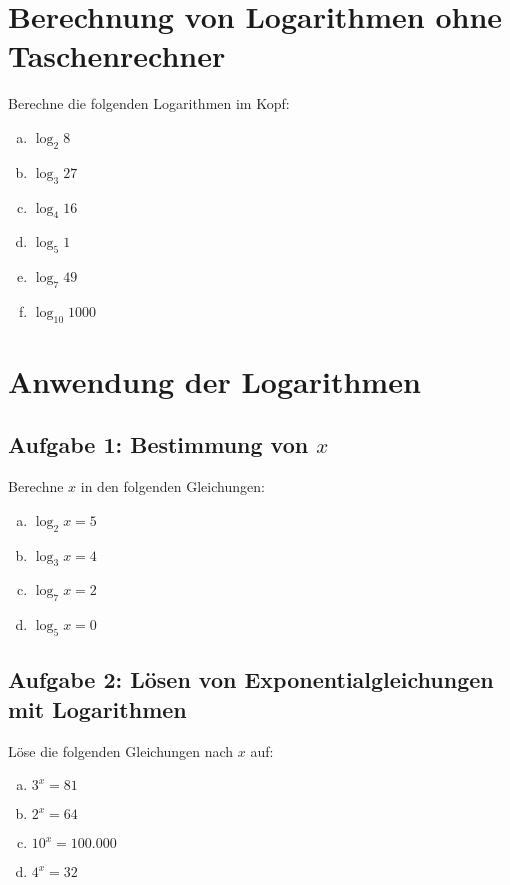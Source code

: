 \section{Berechnung von Logarithmen ohne Taschenrechner}

Berechne die folgenden Logarithmen im Kopf:

\begin{enumerate}[a)]
    \item \( \log_2 8 \)
    \item \( \log_3 27 \)
    \item \( \log_4 16 \)
    \item \( \log_5 1 \)
    \item \( \log_7 49 \)
    \item \( \log_{10} 1000 \)
\end{enumerate}

\section{Anwendung der Logarithmen}

\subsection*{Aufgabe 1: Bestimmung von \( x \)}

Berechne \( x \) in den folgenden Gleichungen:

\begin{enumerate}[a)]
    \item \( \log_2 x = 5 \)
    \item \( \log_3 x = 4 \)
    \item \( \log_7 x = 2 \)
    \item \( \log_5 x = 0 \)
\end{enumerate}

\subsection*{Aufgabe 2: Lösen von Exponentialgleichungen mit Logarithmen}

Löse die folgenden Gleichungen nach \( x \) auf:

\begin{enumerate}[a)]
    \item \( 3^x = 81 \)
    \item \( 2^x = 64 \)
    \item \( 10^x = 100.000 \)
    \item \( 4^x = 32 \)
\end{enumerate}

